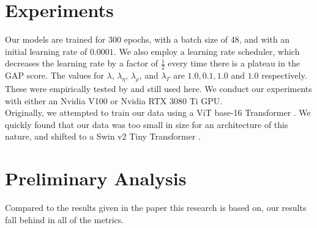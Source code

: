 \documentclass[10pt,twocolumn,letterpaper]{article}
\begin{document}
\section{Experiments}

    
Our models are trained for 300 epochs, with a batch size of 48, and with an initial learning rate of $0.0001$.
We also employ a learning rate scheduler, which decreases the learning rate by a factor of $\frac{1}{2}$ every time there is a plateau in the GAP score.  
The values for $\lambda$, $\lambda_\eta$, $\lambda_\rho$, and $\lambda_\Gamma$ are $1.0,0.1,1.0$ and $1.0$ respectively. These were empirically tested by \cite{ePill} and still used here.
We conduct our experiments with
 either an Nvidia V100 or Nvidia RTX 3080 Ti GPU.
\\

Originally, we attempted to train our data using a ViT base-16 Transformer \cite{an_imageworth}. We quickly found that our data was too small in size for an architecture of this nature, 
and shifted to a Swin v2 Tiny Transformer \cite{swinv2}.

\section{Preliminary Analysis}

Compared to the results given in the paper this research is based on, our results fall behind in all of the metrics.   \par
\end{document}
